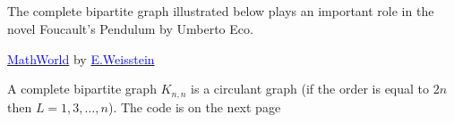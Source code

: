 \subsection{}
\begin{center}
\begin{tkzexample}[vbox] 
\end{tkzexample}
\end{center} 

\vfill\newpage

\subsection{}

The complete bipartite graph  illustrated below plays an important role in the novel Foucault's Pendulum by Umberto Eco.

\href{http://mathworld.wolfram.com/CycleGraph.html}%
           {\textcolor{blue}{MathWorld}} by \href{http://en.wikipedia.org/wiki/Eric_W._Weisstein}%
           {\textcolor{blue}{E.Weisstein}}

\vfill
\begin{center}
\begin{tkzexample}[vbox]
\end{tkzexample}
\end{center}

\vfill\newpage
A complete bipartite graph $K_{n,n}$ is a circulant graph (if the order is equal to $2n$ then $L=1,3,\dots,n$).
The code is on the next page

\bigskip
{}\hspace*{12pt} 

\vspace*{12pt} 
\hspace*{12pt} 

